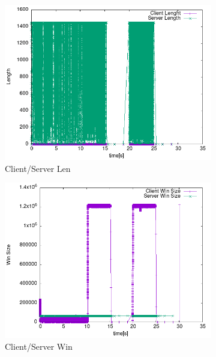 \documentclass{exam}
\begin{document}
\begin{figure}[H]
\begin{subfigure}[b]{0.4\textwidth}
        \label{fig:seq}
    \end{subfigure}
    \hfill
        \begin{subfigure}[b]{0.4\textwidth}
        \centering
        \includegraphics[width=\textwidth]{base_test/len.png}
        \caption{Client/Server Len}
        \label{fig:len}
    \end{subfigure}
    \hfill
    \begin{subfigure}[b]{0.4\textwidth}
        \centering
        \includegraphics[width=\textwidth]{base_test/win.png}
        \caption{Client/Server Win}
        \label{fig:win}
    \end{subfigure}
    \hfill
    \begin{subfigure}[b]{0.4\textwidth}

\end{subfigure}
\end{figure}
\end{document}
